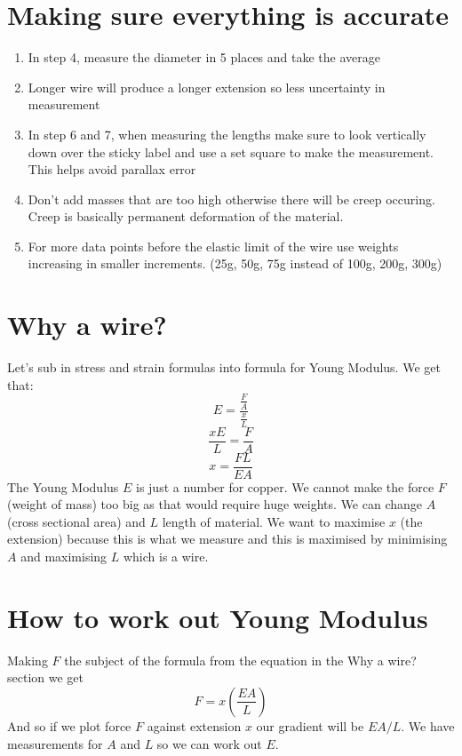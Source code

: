 \documentclass[12pt]{article}
\begin{document}
    \section*{Making sure everything is accurate}
    \begin{enumerate}
        \item In step 4, measure the diameter in 5 places and take the average
        \item Longer wire will produce a longer extension so less uncertainty in measurement
        \item In step 6 and 7, when measuring the lengths make sure to look vertically down
        over the sticky label and use a set square to make the measurement. This helps avoid
        parallax error
        \item Don't add masses that are too high otherwise there will be creep occuring. Creep is
        basically permanent deformation of the material.
        \item For more data points before the elastic limit of the wire use weights increasing in
        smaller increments. (25g, 50g, 75g instead of 100g, 200g, 300g)
    \end{enumerate}

    \section*{Why a wire?}
    Let's sub in stress and strain formulas into formula for Young Modulus. We get that:
    \[ E = \frac{\frac{F}{A}}{\frac{x}{L}} \]
    \[ \frac{xE}{L} = \frac{F}{A} \]
    \[ x = \frac{FL}{EA} \]
    The Young Modulus $E$ is just a number for copper. We cannot make the force $F$ 
    (weight of mass) too big as that would require huge weights. We can change $A$ (cross 
    sectional area) and $L$ length of material. We want to maximise $x$ (the extension) because
    this is what we measure and this is maximised by minimising $A$ and maximising $L$ which is
    a wire.


    \section*{How to work out Young Modulus}
    Making $F$ the subject of the formula from the equation in the Why a wire? section we get
    \[ F = x \left(\frac{EA}{L}\right) \]
    And so if we plot force $F$ against extension $x$ our gradient will be $EA/L$. We have measurements
    for $A$ and $L$ so we can work out $E$.
\end{document}
